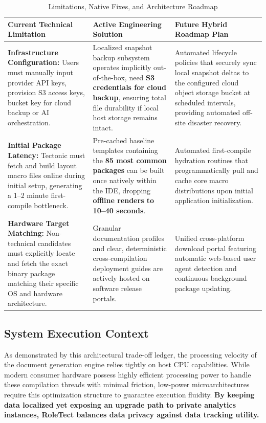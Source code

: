 \documentclass[10pt,a4paper]{article}
\begin{document}
\begin{table}[h]
\centering
\caption{Limitations, Native Fixes, and Architecture Roadmap}
\vspace{2mm}
\small
\begin{tabular}{p{4.2cm}p{5.2cm}p{5.2cm}}
\toprule
\textbf{Current Technical Limitation} & \textbf{Active Engineering Solution} & \textbf{Future Hybrid Roadmap Plan} \\
\midrule
\textbf{Infrastructure Configuration:} Users must manually input provider API keys, provision S3 access keys, bucket key for cloud backup or AI orchestration. & Localized snapshot backup subsystem operates implicitly out-of-the-box, need \textbf{S3 credentials for cloud backup}, ensuring total file durability if local host storage remains intact. &Automated lifecycle policies that securely sync local snapshot deltas to the configured cloud object storage bucket at scheduled intervals, providing automated off-site disaster recovery.\\
\addlinespace
\textbf{Initial Package Latency:} Tectonic must fetch and build layout macro files online during initial setup, generating a 1--2 minute first-compile bottleneck. & Pre-cached baseline templates containing the \textbf{85 most common packages} can be built once natively within the IDE, dropping \textbf{offline renders to 10--40 seconds}. & Automated first-compile hydration routines that programmatically pull and cache core macro distributions upon initial application initialization. \\
\addlinespace
\textbf{Hardware Target Matching:} Non-technical candidates must explicitly locate and fetch the exact binary package matching their specific OS and hardware architecture. & Granular documentation profiles and clear, deterministic cross-compilation deployment guides are actively hosted on software release portals. & Unified cross-platform download portal featuring automatic web-based user agent detection and continuous background package updating. \\
\bottomrule
\end{tabular}
\end{table}

\subsection{System Execution Context}
As demonstrated by this architectural trade-off ledger, the processing velocity of the document generation engine relies tightly on host CPU capabilities. While modern consumer hardware possess highly efficient processing power to handle these compilation threads with minimal friction, low-power microarchitectures require this optimization structure to guarantee execution fluidity. \textbf{By keeping data localized yet exposing an upgrade path to private analytics instances, RoleTect balances data privacy against data tracking utility.}
\end{document}
